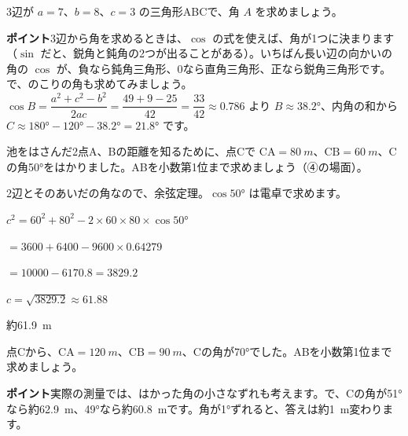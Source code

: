 \begin{jibun}
3辺が $a=7$、$b=8$、$c=3$ の三角形ABCで、角 $A$ を求めましょう。
\end{jibun}
\textbf{ポイント}\quad 3辺から角を求めるときは、$\cos$ の式を使えば、角が1つに決まります（$\sin$ だと、鋭角と鈍角の2つが出ることがある）。いちばん長い辺の向かいの角の $\cos$ が、負なら鈍角三角形、0なら直角三角形、正なら鋭角三角形です。で、のこりの角も求めてみましょう。$\cos B=\dfrac{a^2+c^2-b^2}{2ac}=\dfrac{49+9-25}{42}=\dfrac{33}{42}\approx0.786$ より $B\approx\ang{38.2}$、内角の和から $C\approx\ang{180}-\ang{120}-\ang{38.2}=\ang{21.8}$ です。

\begin{reidai}
池をはさんだ2点A、Bの距離を知るために、点Cで $\mathrm{CA}=\qty{80}{m}$、$\mathrm{CB}=\qty{60}{m}$、Cの角\ang{50}をはかりました。ABを小数第1位まで求めましょう（④の場面）。\par
\kangaekata 2辺とそのあいだの角なので、余弦定理。$\cos\ang{50}$ は電卓で求めます。\par
\shiki $c^2=60^2+80^2-2\times60\times80\times\cos\ang{50}$\par
\hspace*{4.6\zw}$=3600+6400-9600\times0.64279$\par
\hspace*{4.6\zw}$=\num{10000}-6170.8=3829.2$\par
\hspace*{2.6\zw}$c=\sqrt{3829.2}\approx61.88$\par
\kotae 約\qty{61.9}{m}
\end{reidai}

\begin{jibun}
点Cから、$\mathrm{CA}=\qty{120}{m}$、$\mathrm{CB}=\qty{90}{m}$、Cの角が\ang{70}でした。ABを小数第1位まで求めましょう。
\end{jibun}
\textbf{ポイント}\quad 実際の測量では、はかった角の小さなずれも考えます。で、Cの角が\ang{51}なら約\qty{62.9}{m}、\ang{49}なら約\qty{60.8}{m}です。角が\ang{1}ずれると、答えは約\qty{1}{m}変わります。

